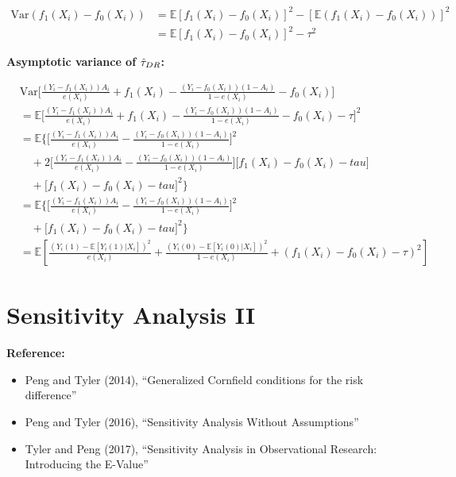 \documentclass[
]{book}
\providecommand{\tightlist}{%
  \setlength{\itemsep}{0pt}\setlength{\parskip}{0pt}}
\begin{document}
\begin{align*}
\text{Var}(f_1(X_i) - f_0(X_i)) &= \mathbb{E}[f_1(X_i) - f_0(X_i)]^2 - [\mathbb{E}(f_1(X_i) - f_0(X_i))]^2\\
&=\mathbb{E}[f_1(X_i) - f_0(X_i)]^2 - \tau^2
\end{align*}

\textbf{Asymptotic variance of \(\hat{\Large\tau}_{DR}\):}

\begin{align*}
&\text{Var}\bigg[ \frac{(Y_i - f_1(X_i))A_i}{e(X_i)} + f_1(X_i) -\frac{(Y_i - f_0(X_i))(1-A_i)}{1-e(X_i)} - f_0(X_i)\bigg] \\
&= \mathbb{E}\bigg[ \frac{(Y_i - f_1(X_i))A_i}{e(X_i)} + f_1(X_i) -\frac{(Y_i - f_0(X_i))(1-A_i)}{1-e(X_i)} - f_0(X_i) - \tau\bigg]^2 \\
&=\mathbb{E} \bigg\{  \bigg[\frac{(Y_i - f_1(X_i))A_i}{e(X_i)}- \frac{(Y_i - f_0(X_i))(1-A_i)}{1-e(X_i)}\bigg]^2 \\
&\,\,\,\,\,\,+ 2\bigg[\frac{(Y_i - f_1(X_i))A_i}{e(X_i)}- \frac{(Y_i - f_0(X_i))(1-A_i)}{1-e(X_i)}\bigg]\bigg[f_1(X_i) - f_0(X_i) - tau\bigg]\\
&\,\,\,\,\,\,+ \bigg[f_1(X_i) - f_0(X_i) - tau\bigg]^2 \bigg\} \\
&=\mathbb{E} \bigg\{  \bigg[\frac{(Y_i - f_1(X_i))A_i}{e(X_i)}- \frac{(Y_i - f_0(X_i))(1-A_i)}{1-e(X_i)}\bigg]^2 \\
&\,\,\,\,\,\,+ \bigg[f_1(X_i) - f_0(X_i) - tau\bigg]^2 \bigg\} \\
&= \mathbb{E}\left[\frac{\left(Y_{i}(1)-\mathbb{E}\left[Y_{i}(1) | X_{i}\right]\right)^{2}}{e\left(X_{i}\right)}+\frac{\left(Y_{i}(0)-\mathbb{E}\left[Y_{i}(0) | X_{i}\right]\right)^{2}}{1-e\left(X_{i}\right)}+\left(f_{1}\left(X_{i}\right)-f_{0}\left(X_{i}\right)-\tau\right)^{2}\right]
\end{align*}

\hypertarget{sensitivity2}{%
\chapter{Sensitivity Analysis II}\label{sensitivity2}}

\textbf{Reference:}

\begin{itemize}
\tightlist
\item
  Peng and Tyler (2014), ``Generalized Cornfield conditions for the risk difference''
\item
  Peng and Tyler (2016), ``Sensitivity Analysis Without Assumptions''
\item
  Tyler and Peng (2017), ``Sensitivity Analysis in Observational Research: Introducing the E-Value''
\end{itemize}
\end{document}
